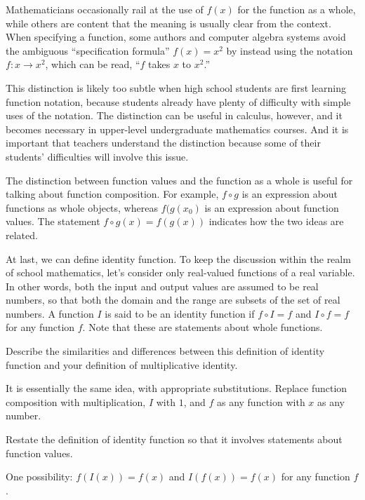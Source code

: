 \documentclass{ximera}
\begin{document}
Mathematicians occasionally rail at the use of  $f(x)$ for the function as a whole, while others are content that the meaning is usually clear from the context.  When specifying a function, some authors and computer algebra systems avoid the ambiguous ``specification formula'' $f(x)=x^2$ by instead using the notation $f: x\rightarrow x^2$, which can be read, ``$f$ takes $x$ to $x^2$.''

This distinction is likely too subtle when high school students are first learning function notation, because students already have plenty of difficulty with simple uses of the notation.  The distinction can be useful in calculus, however, and it becomes necessary in upper-level undergraduate mathematics courses.  And it is important that teachers understand the distinction because some of their students' difficulties will involve this issue.

The distinction between function values and the function as a whole is useful for talking about function composition.  For example, $f\circ g$ is an expression about functions as whole objects, whereas $f(g(x_0)$ is an expression about function values.  The statement $f\circ g(x) = f(g(x))$ indicates how the two ideas are related.  

At last, we can define identity function.  To keep the discussion within the realm of school mathematics, let's consider only real-valued functions of a real variable.  In other words, both the input and output values are assumed to be real numbers, so that both the domain and the range are subsets of the set of real numbers.  A function $I$ is said to be an identity function if $f\circ I=f$ and $I\circ f = f$ for any function $f$.  Note that these are statements about whole functions.  

\begin{question}
Describe the similarities and differences between this definition of identity function and your definition of multiplicative identity.  
\begin{freeResponse}
It is essentially the same idea, with appropriate substitutions.  Replace function composition with multiplication, $I$ with $1$, and $f$ as any function with $x$ as any number.  
\end{freeResponse}
\end{question}

\begin{question}
Restate the definition of identity function so that it involves statements about function values.  
\begin{freeResponse}
One possibility:  $f(I(x)) = f(x)$ and $I(f(x))=f(x)$ for any function $f$.  
\end{freeResponse}
\end{question}
\end{document}
